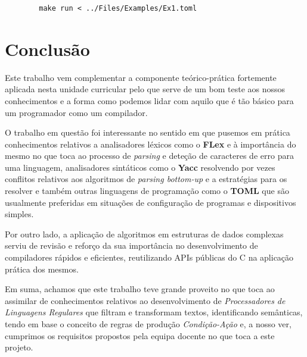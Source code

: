 \documentclass[a4paper,12pt]{report}
\begin{document}
\begin{verbatim}
        make run < ../Files/Examples/Ex1.toml
\end{verbatim}



\chapter{Conclusão}

Este trabalho vem complementar a componente teórico-prática fortemente aplicada nesta unidade curricular pelo que serve de um bom teste aos nossos conhecimentos e a forma como podemos lidar com aquilo que é tão básico para um programador como um compilador.
\par
O trabalho em questão foi interessante no sentido em que pusemos em prática conhecimentos relativos a analisadores léxicos como o \textbf{FLex} e à importância do mesmo no que toca ao processo de \textit{parsing} e deteção de caracteres de erro para uma linguagem, analisadores sintáticos como o \textbf{Yacc} resolvendo por vezes conflitos relativos aos algoritmos de \textit{parsing bottom-up} e a estratégias para os resolver e também outras linguagens de programação como o \textbf{TOML} que são usualmente preferidas em situações de configuração de programas e dispositivos simples. 
\par
Por outro lado, a aplicação de algoritmos em estruturas de dados complexas serviu de revisão e reforço da sua importância no desenvolvimento de compiladores rápidos e eficientes, reutilizando APIs públicas do C na aplicação prática dos mesmos.
\par Em suma, achamos que este trabalho teve grande proveito no que toca ao assimilar de conhecimentos relativos ao desenvolvimento de \textit{Processadores de Linguagens Regulares} que filtram e transformam textos, identificando semânticas, tendo em base o conceito de regras de produção \textit{Condição-Ação} e, a nosso ver, cumprimos os requisitos propostos pela equipa docente no que toca a este projeto.
\end{document}
